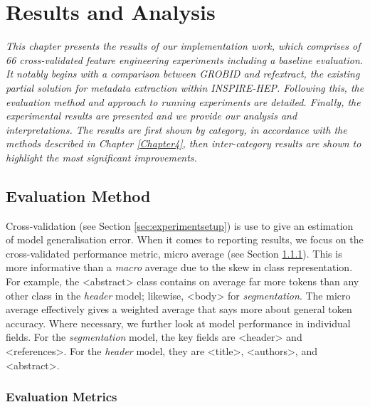 
\chapter{Results and Analysis} %

\label{Chapter5} %


\emph{This chapter presents the results of our implementation work, which comprises of 66 cross-validated feature engineering experiments including a baseline evaluation. It notably begins with a comparison between GROBID and refextract, the existing partial solution for metadata extraction within INSPIRE-HEP. Following this, the evaluation method and approach to running experiments are detailed. Finally, the experimental results are presented and we provide our analysis and interpretations. The results are first shown by category, in accordance with the methods described in Chapter \ref{Chapter4}, then inter-category results are shown to highlight the most significant improvements.}

\section{Evaluation Method}

Cross-validation (see Section \ref{sec:experimentsetup}) is use to give an estimation of model generalisation error. When it comes to reporting results, we focus on the cross-validated performance metric, micro average (see Section \ref{subsec:evaluationmethod}). This is more informative than a \emph{macro} average due to the skew in class representation. For example, the <abstract> class contains on average far more tokens than any other class in the \emph{header} model; likewise, <body> for \emph{segmentation}. The micro average effectively gives a weighted average that says more about general token accuracy. Where necessary, we further look at model performance in individual fields. For the \emph{segmentation} model, the key fields are <header> and <references>. For the \emph{header} model, they are <title>, <authors>, and <abstract>.

\subsection{Evaluation Metrics}
\label{subsec:evaluationmethod}

